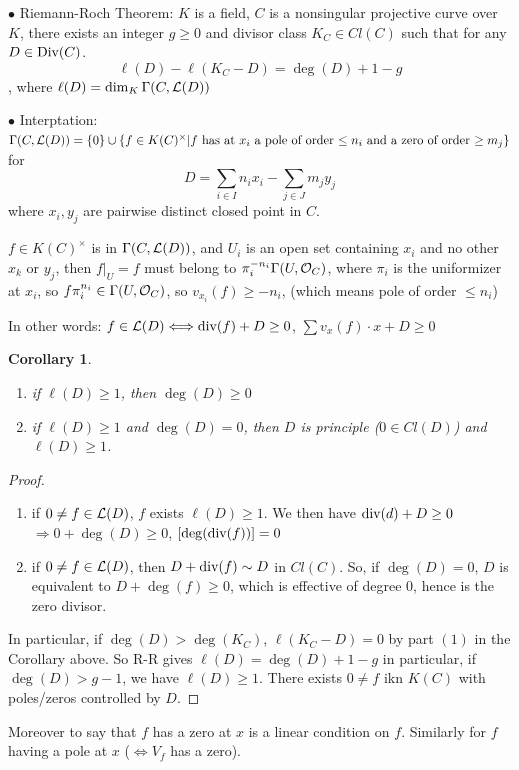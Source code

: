 \documentclass[11pt]{article}
\newtheorem{cor}[thm]{Corollary}
\newcommand{\call}{{\cal L}}
\newcommand{\calo}{{\cal O}}
\renewcommand{\div}{\textnormal{div}}
\newcommand{\Div}{\textnormal{Div}}
\newcommand{\Lrta}{\Longrightarrow}
\newcommand{\Llrta}{\Longleftrightarrow}
\begin{document}
$\bullet$ Riemann-Roch Theorem: $K$ is a field, $C$ is a nonsingular projective curve over $K$, there exists an integer $g\geq 0$ and divisor class $K_C\in Cl(C)$ such that for any $D\in \Div(C)$.
$$
\ell(D)-\ell(K_C-D)=\deg(D)+1-g
$$
, where $\ell(D)=\dim_K\Gamma(C,\call(D))$

$\bullet$ Interptation: $\Gamma(C,\call(D))=\{0\}\cup \{f\in K(C)^\times|f\text{ has at $x_i$ a pole of order $\leq n_i$ and a zero of order $\geq m_j$} \}$ for 
$$
D=\sum_{i\in I} n_i x_i-\sum_{j\in J} m_j y_j
$$
where $x_i,y_j$ are pairwise distinct closed point in $C$.

$f\in K(C)^\times$ is in $\Gamma(C,\call(D))$, and $U_i$ is an open set containing $x_i$ and no other $x_k$ or $y_j$, then $f|_U=f$ must belong to $\pi_i^{-n_i}\Gamma(U,\calo_C)$, where $\pi_i$ is the uniformizer at $x_i$, so $f\pi_i^{n_i}\in \Gamma(U,\calo_C)$, so $v_{x_i}(f)\geq -n_i$, (which means pole of order $\leq n_i$)

In other words: $f\in \call(D)\Llrta \div(f)+D\geq 0$, $\sum v_x(f)\cdot x+D\geq 0$

\begin{cor}\ 
\begin{enumerate}[label=(\arabic*)]
\item if $\ell(D)\geq 1$, then $\deg(D)\geq 0$
\item if $\ell(D)\geq 1$ and $\deg(D)=0$, then $D$ is principle ($0\in Cl(D)$) and $\ell(D)\geq 1$.
\end{enumerate}
\end{cor}
\begin{proof}
\begin{enumerate}[label=(\arabic*)]
\item if $0\neq f\in \call(D)$, $f$ exists $\ell(D)\geq 1$. We then have $\div(d)+D\geq 0$ $\Lrta 0+\deg(D)\geq 0$, $[\deg(\div(f))]=0$
\item if $0\neq f\in \call(D)$, then $D+\div(f)\sim D$ in $Cl(C)$. So, if $\deg(D)=0$, $D$ is equivalent to $D+\deg(f)\geq 0$, which is effective of degree $0$, hence is the zero divisor.
\end{enumerate}

In particular, if $\deg(D)>\deg(K_C)$, $\ell(K_C-D)=0$ by part $(1)$ in the Corollary above. So R-R
 gives $\ell(D)=\deg(D)+1-g$ in particular, if $\deg(D)>g-1$,  we have $\ell(D)\geq 1$. There exists $0\neq f$ ikn $K(C)$ with poles/zeros controlled by $D$.
 \end{proof}

 Moreover to say that $f$ has a zero at $x$ is a linear condition on $f$. Similarly for $f$ having  a pole at $x$ ($\Llrta V_f$ has a zero).
\end{document}

